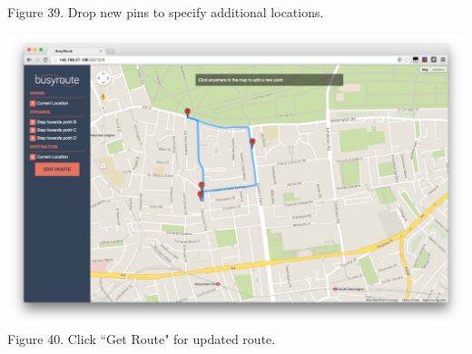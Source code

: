 \documentclass[a4paper, 10pt]{report}
\begin{document}
\begin{appendices}
\begin{center}
Figure 39. Drop new pins to specify additional locations.
\end{center}
\begin{center}
\includegraphics[scale=0.18]{um-13-get-new-route.png}\\
Figure 40. Click ``Get Route" for updated route.
\end{center}

\end{appendices}
\end{document}
